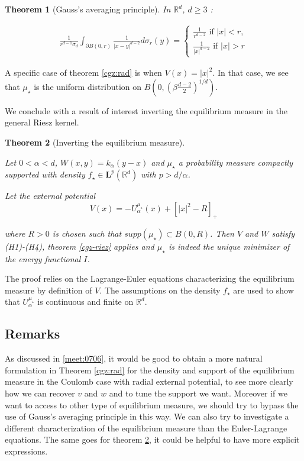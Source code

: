 \documentclass[a4paper,12pt]{report}
\newtheorem{thm}{Theorem}
\begin{document}
\begin{thm}[Gauss's averaging principle]
In $\mathbb{R}^{d}$, $d\geq 3$ :

\begin{align*}
    \frac{1}{r^{d-1}\sigma_{d}}\int_{\partial B(0, r)} \frac{1}{\lvert x-y\rvert^{d-2}} d\sigma_{r}(y) =  \left\{\begin{array}{c}
	\frac{1}{r^{d-2}}\text{  if } \lvert x \rvert < r,\\
	\frac{1}{\lvert x\rvert^{d-2}}  \text{  if } \lvert x\rvert > r
\end{array}\right.
\end{align*}
\end{thm}

A specific case of theorem \ref{cgz:rad} is when $V(x) = \lvert x\rvert^{2}$. In that case, we see that $\mu_{\star}$ is the uniform distribution on $B\left(0, \left(\beta \frac{d-2}{2}\right)^{1/d}\right)$.
\vspace{0.5cm}

We conclude with a result of interest inverting the equilibrium measure in the general Riesz kernel.

\begin{thm}[Inverting the equilibrium measure]\label{cgz:inv}

Let $0 < \alpha < d$, $W(x, y) = k_{\alpha}(y-x)$ and $\mu_{\star}$ a probability measure compactly supported with density $f_{\star} \in \textbf{L}^{p}(\mathbb{R}^{d})$ with $p > d/\alpha$.

Let the external potential 
\[V(x) = - U_{\alpha}^{\mu_{\star}}(x) + \left[ \lvert x\rvert^{2} - R\right]_{+}\]

where $R > 0$ is chosen such that $supp(\mu_{\star}) \subset B(0, R)$. Then $V$ and $W$ satisfy (H1)-(H4), theorem \ref{cgz-riez} applies and $\mu_{\star}$ is indeed the unique minimizer of the energy functional $I$.
\end{thm}

The proof relies on the Lagrange-Euler equations characterizing the equilibrium measure by definition of $V$. The assumptions on the density $f_{\star}$ are used to show that $U_{\alpha}^{\mu_{\star}}$ is continuous and finite on $\mathbb{R}^{d}$.


\subsection{Remarks}

As discussed in \ref{meet:0706}, it would be good to obtain a more natural formulation in Theorem \ref{cgz:rad} for the density and support of the equilibrium measure in the Coulomb case with radial external potential, to see more clearly how we can recover $v$ and $w$ and to tune the support we want. Moreover if we want to access to other type of equilibrium measure, we should try to bypass the use of Gauss's averaging principle in this way. We can also try to investigate a different characterization of the equilibrium measure than the Euler-Lagrange equations. The same goes for theorem \ref{cgz:inv}, it could be helpful to have more explicit expressions.
\vspace{0.5cm}
\end{document}
